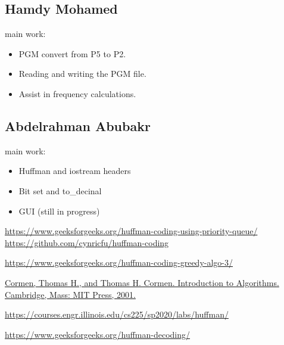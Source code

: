 \documentclass[14 pt,a4paper,double column]{article}
\begin{document}
\subsection{Hamdy Mohamed}
main work:
\begin{itemize}
    \item PGM  convert from P5 to P2.
    \item Reading and writing the PGM file.
    \item Assist in frequency  calculations.
\end{itemize}

\subsection{Abdelrahman Abubakr}
main work:
\begin{itemize}
    \item Huffman and iostream headers
    \item Bit set and to\_decinal
    \item GUI (still in progress)
\end{itemize}
\begin{thebibliography}{10}
 \href{URL}{https://www.geeksforgeeks.org/huffman-coding-using-priority-queue/}
 \href{URL}{https://github.com/cynricfu/huffman-coding}

 \href{URL}{https://www.geeksforgeeks.org/huffman-coding-greedy-algo-3/}

 \href{URL}{Cormen, Thomas H., and Thomas H. Cormen. Introduction to Algorithms. Cambridge, Mass: MIT Press, 2001.}

 \href{URL}{https://courses.engr.illinois.edu/cs225/sp2020/labs/huffman/}

 \href{URL}{https://www.geeksforgeeks.org/huffman-decoding/}

\end{thebibliography}
\end{document}
